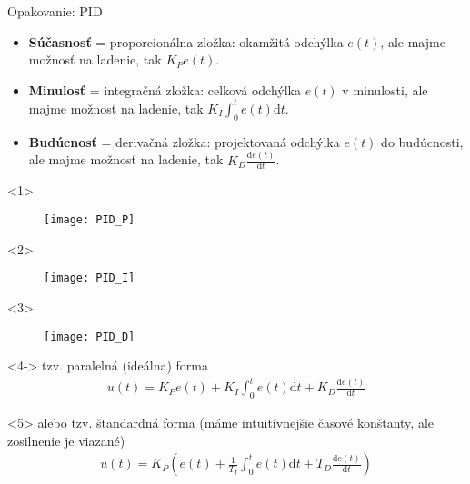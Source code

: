 \begin{frame}[t]{Opakovanie: PID}
  \begin{itemize}
    \item<1-> \textbf{Súčasnosť} = proporcionálna zložka: okamžitá odchýlka $e(t)$, ale majme možnosť na ladenie, tak $K_Pe(t)$.
    \item<2-> \textbf{Minulosť} = integračná zložka: celková odchýlka $e(t)$ v minulosti, ale majme možnosť na ladenie, tak $K_I\int_0^te(t)\mathrm{d}t$.
    \item<3-> \textbf{Budúcnosť} = derivačná zložka: projektovaná odchýlka $e(t)$ do budúcnosti, ale majme možnosť na ladenie, tak $K_D\frac{\mathrm{d}e(t)}{\mathrm{d}t}$.
  \end{itemize}

\begin{onlyenv}<1>
\begin{figure}
\centering
  \texttt{[image: PID\_P]}\\
\end{figure}
\end{onlyenv}

\begin{onlyenv}<2>
\begin{figure}
\centering
  \texttt{[image: PID\_I]}\\
\end{figure}
\end{onlyenv}

\begin{onlyenv}<3>
\begin{figure}
\centering
  \texttt{[image: PID\_D]}\\
\end{figure}
\end{onlyenv}


\begin{onlyenv}<4->
tzv. paralelná (ideálna) forma
\begin{align}
u(t)= K_Pe(t)+K_I\int_0^te(t)\mathrm{d}t+K_D\frac{\mathrm{d}e(t)}{\mathrm{d}t}
\end{align}
\end{onlyenv}

\begin{onlyenv}<5>
alebo tzv. štandardná forma (máme intuitívnejšie časové konštanty, ale zosilnenie je viazané)
\begin{align}
u(t)= K_P\left(e(t)+\frac{1}{T_I}\int_0^te(t)\mathrm{d}t+T_D\frac{\mathrm{d}e(t)}{\mathrm{d}t}\right)
\end{align}
\end{onlyenv}
\end{frame}




